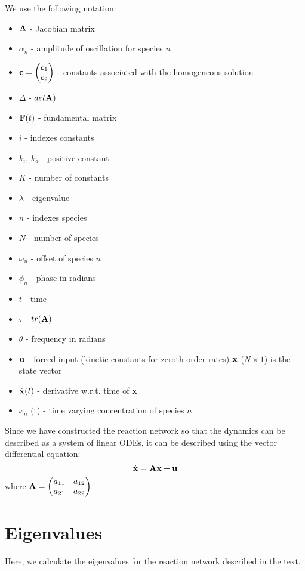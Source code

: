 \documentclass[11pt]{article}
\begin{document}
We use the following notation: 
\begin{itemize}
\item ${\bf A}$ - Jacobian matrix
\item $\alpha_n$ - amplitude of oscillation for species $n$
\item ${\bf c} = \begin{pmatrix} c_1 \\ c_2 \end{pmatrix}$ - constants associated with the homogeneous solution
\item $\Delta$ -
$det {\bf A})$
\item  ${\bf F} (t)$ - fundamental matrix
\item $i$ - indexes constants
\item $k_i$, $k_d$ -
positive constant 
\item $K$ - number of constants
\item $\lambda$ -
eigenvalue
\item $n$ - indexes species
\item $N$ - number of species
\item $\omega_n$ - offset of species $n$ 
\item $\phi_n$ - phase in radians
\item $t$ - time 
\item $\tau$ - $tr({\bf A})$ 
\item $\theta$ - frequency in
radians 
\item ${\bf u}$ - forced input (kinetic constants for zeroth order
rates)  ${\bf x}$ ($N \times 1$) is the state vector
\item $\dot{\bf x} (t)$ - derivative w.r.t. time of ${\bf x}$
\item $x_n$
(t) - time varying concentration of species $n$
\end{itemize}

    Since we have constructed the reaction network so that the dynamics can
be described as a system of linear ODEs, it can be described using the
vector differential equation: 
\begin{equation*}
\dot{\bf x} = {\bf A} {\bf x} + {\bf u}
\end{equation*} where
${\bf A} = \begin{pmatrix} a_{11} & a_{12} \\ a_{21} & a_{22} \\ \end{pmatrix}$

\section{Eigenvalues}
Here, we calculate the eigenvalues for the reaction network described
in the text.
\end{document}

